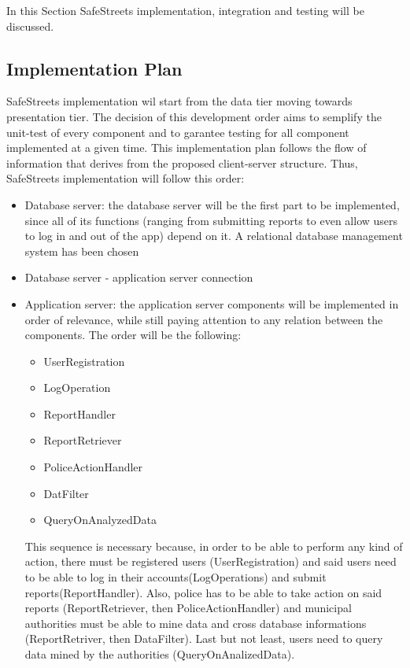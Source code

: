 In this Section SafeStreets implementation, integration and testing will be discussed.
\\

\subsection{Implementation Plan}
SafeStreets implementation wil start from the data tier moving towards presentation tier. The decision of this development order aims to semplify  the unit-test of every component and to garantee testing for all component implemented at a given time. This implementation plan follows the flow of information that derives from the proposed client-server structure.\newline
Thus, SafeStreets implementation will follow this order:
\begin{itemize}
	\item Database server: the database server will be the first part to be implemented, since all of its functions (ranging from submitting reports to even allow users to log in and out of the app) depend on it. A relational database management system has been chosen
	\item Database server - application server connection
	\item Application server: the application server components will be implemented in order of relevance, while still paying attention to any relation between the components. The order will be the following:
	\begin{itemize}
		\item UserRegistration
		\item LogOperation
		\item ReportHandler
		\item ReportRetriever
		\item PoliceActionHandler
		\item DatFilter
		\item QueryOnAnalyzedData
	\end{itemize}
	This sequence is necessary because, in order to be able to perform any kind of action, there must be registered users (UserRegistration) and said users need to be able to log in their accounts(LogOperations) and submit reports(ReportHandler). Also, police has to be able to take action on said reports (ReportRetriever, then PoliceActionHandler) and municipal authorities must be able to mine data and cross database informations (ReportRetriver, then DataFilter). Last but not least, users need to query data mined by the authorities (QueryOnAnalizedData).

\end{itemize}
